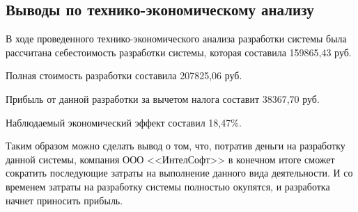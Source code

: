 \subsection{Выводы по технико-экономическому анализу }

В ходе проведенного технико-экономического анализа разработки системы была рассчитана себестоимость разработки системы, которая составила 159865,43 руб.

Полная стоимость разработки составила 207825,06 руб.

Прибыль от данной разработки за вычетом налога составит 38367,70 руб.

Наблюдаемый экономический эффект составил 18,47\%.

Таким образом можно сделать вывод о том, что, потратив деньги на разработку данной системы, компания ООО <<ИнтелСофт>> в конечном итоге сможет сократить последующие затраты на выполнение данного вида деятельности.
И со временем затраты на разработку системы полностью окупятся, и разработка начнет приносить прибыль.


\clearpage
\newpage
